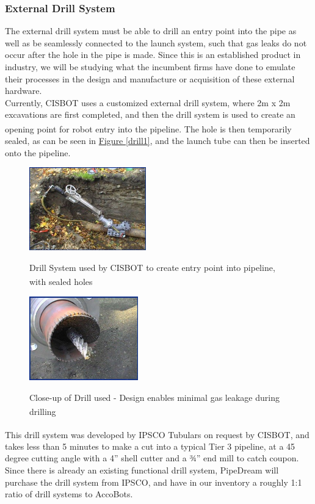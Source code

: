 \documentclass[11pt]{article}		%
\newcommand{\supercite}[1]{\textsuperscript{\cite{#1}}}		%
\newcommand{\figref}[1]{\hyperref[#1]{Figure \ref*{#1}}}    %
\begin{document}
		\subsubsection{External Drill System}
		The external drill system must be able to drill an entry point into the pipe as well as be seamlessly connected to the launch system, such that gas leaks do not occur after the hole in the pipe is made. Since this is an established product in industry, we will be studying what the incumbent firms have done to emulate their processes in the design and manufacture or acquisition of these external hardware.
        \\ \hspace*{3ex}Currently, CISBOT uses a customized external drill system, where 2m x 2m excavations are first completed, and then the drill system is used to create an opening point for robot entry into the pipeline\supercite{cisbotdrill}. The hole is then temporarily sealed, as can be seen in \figref{drill1}, and the launch tube can then be inserted onto the pipeline. 
        
				\begin{figure}[h]
				\centering
				\begin{multicols}{2}
				    \includegraphics[width = 0.45\textwidth]{drill1.jpg}
    				\caption{Drill System used by CISBOT to create entry point into pipeline, with sealed holes\supercite{drill1} }
    				\label{drill1}
    				\columnbreak
    				\includegraphics[width = 0.42\textwidth]{drill2.jpg}
    				\caption{Close-up of Drill used - Design enables minimal gas leakage during drilling\supercite{drill2}}
    				\label{drill2}
				\end{multicols}
			\end{figure}
		This drill system was developed by IPSCO Tubulars on request by CISBOT\supercite{ipsco}, and takes less than 5 minutes to make a cut into a typical Tier 3 pipeline, at a 45 degree cutting angle with a 4” shell cutter and a ¾” end mill to catch coupon.
        \\ \hspace*{3ex}Since there is already an existing functional drill system, PipeDream will purchase the drill system from IPSCO, and have in our inventory a roughly 1:1 ratio of drill systems to AccoBots. 
\end{document}
